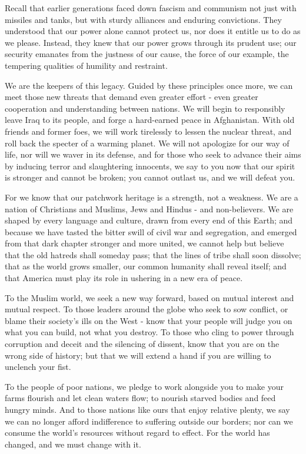 \documentclass[12pt,a4paper,onecolumn]{article}
\begin{document}
\begin{sffamily}
Recall that earlier generations faced down fascism and communism not just with missiles and tanks,
but with sturdy alliances and enduring convictions. They understood that our power alone cannot
protect us, nor does it entitle us to do as we please. Instead, they knew that our power grows
through its prudent use; our security emanates from the justness of our cause, the force of our
example, the tempering qualities of humility and restraint.

We are the keepers of this legacy. Guided by these principles once more, we can meet those new
threats that demand even greater effort - even greater cooperation and understanding between
nations. We will begin to responsibly leave Iraq to its people, and forge a hard-earned peace in
Afghanistan. With old friends and former foes, we will work tirelessly to lessen the nuclear threat,
and roll back the specter of a warming planet. We will not apologize for our way of life, nor will
we waver in its defense, and for those who seek to advance their aims by inducing terror and
slaughtering innocents, we say to you now that our spirit is stronger and cannot be broken; you
cannot outlast us, and we will defeat you.

For we know that our patchwork heritage is a strength, not a weakness. We are a nation of Christians
and Muslims, Jews and Hindus - and non-believers. We are shaped by every language and culture, drawn
from every end of this Earth; and because we have tasted the bitter swill of civil war and
segregation, and emerged from that dark chapter stronger and more united, we cannot help but believe
that the old hatreds shall someday pass; that the lines of tribe shall soon dissolve; that as the
world grows smaller, our common humanity shall reveal itself; and that America must play its role in
ushering in a new era of peace.

To the Muslim world, we seek a new way forward, based on mutual interest and mutual respect. To
those leaders around the globe who seek to sow conflict, or blame their society's ills on the West -
know that your people will judge you on what you can build, not what you destroy. To those who cling
to power through corruption and deceit and the silencing of dissent, know that you are on the wrong
side of history; but that we will extend a hand if you are willing to unclench your fist.

To the people of poor nations, we pledge to work alongside you to make your farms flourish and let
clean waters flow; to nourish starved bodies and feed hungry minds. And to those nations like ours
that enjoy relative plenty, we say we can no longer afford indifference to suffering outside our
borders; nor can we consume the world's resources without regard to effect. For the world has
changed, and we must change with it.


\end{sffamily}
\end{document}
